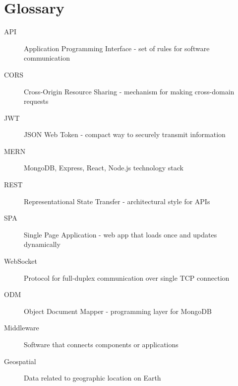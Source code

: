 \documentclass[12pt,a4paper]{article}
\begin{document}
\section{Glossary}

\begin{description}
    \item[API] Application Programming Interface - set of rules for software communication
    \item[CORS] Cross-Origin Resource Sharing - mechanism for making cross-domain requests
    \item[JWT] JSON Web Token - compact way to securely transmit information
    \item[MERN] MongoDB, Express, React, Node.js technology stack
    \item[REST] Representational State Transfer - architectural style for APIs
    \item[SPA] Single Page Application - web app that loads once and updates dynamically
    \item[WebSocket] Protocol for full-duplex communication over single TCP connection
    \item[ODM] Object Document Mapper - programming layer for MongoDB
    \item[Middleware] Software that connects components or applications
    \item[Geospatial] Data related to geographic location on Earth
\end{description}
\end{document}
